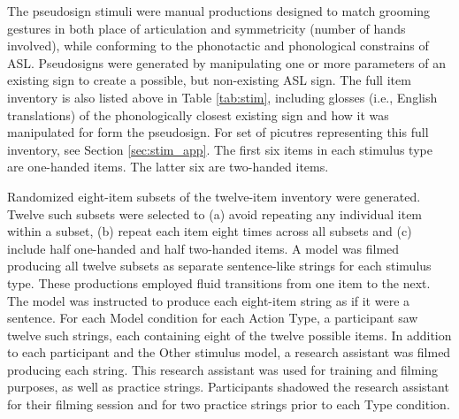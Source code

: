             
 

            The pseudosign stimuli were manual productions designed to match grooming gestures in both place of articulation and symmetricity (number of hands involved), while conforming to the phonotactic and phonological constrains of ASL. Pseudosigns were generated by manipulating one or more parameters of an existing sign to create a possible, but non-existing ASL sign. The full item inventory is also listed above in Table \ref{tab:stim}, including glosses (i.e., English translations) of the phonologically closest existing sign and how it was manipulated for form the pseudosign. For set of picutres representing this full inventory, see Section \ref{sec:stim_app}. The first six items in each stimulus type are one-handed items. The latter six are two-handed items. \par
            Randomized eight-item subsets of the twelve-item inventory were generated. Twelve such subsets were selected to (a) avoid repeating any individual item within a subset, (b) repeat each item eight times across all subsets and (c) include half one-handed and half two-handed items. A model was filmed producing all twelve subsets as separate sentence-like strings for each stimulus type. These productions employed fluid transitions from one item to the next. The model was instructed to produce each eight-item string as if it were a sentence. For each Model condition for each Action Type, a participant saw twelve such strings, each containing eight of the twelve possible items. In addition to each participant and the Other stimulus model, a research assistant was filmed producing each string. This research assistant was used for training and filming purposes, as well as practice strings. Participants shadowed the research assistant for their filming session and for two practice strings prior to each Type condition. \par
